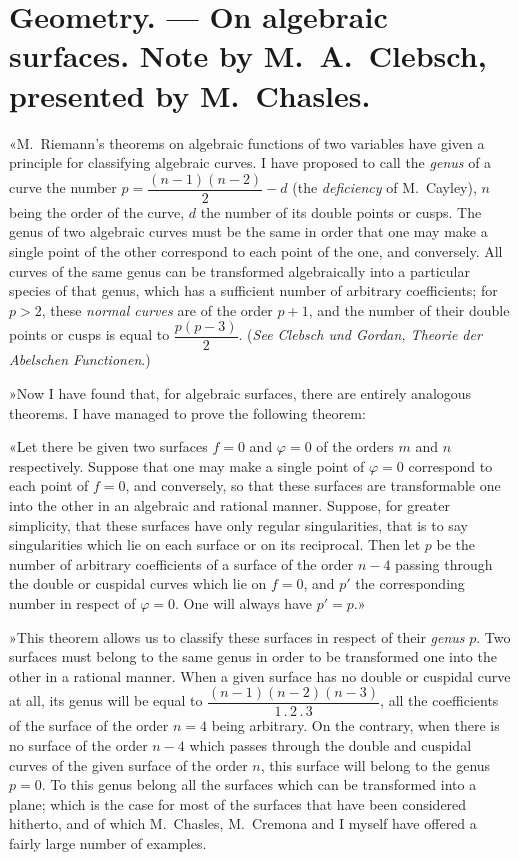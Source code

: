 \documentclass{article}
\begin{document}
\section*{Geometry. --- On algebraic surfaces. Note by M.\ A.\ Clebsch, presented by M.\ Chasles.}

«M.\ Riemann's theorems on algebraic functions of two variables have given a principle for classifying algebraic curves. I have proposed to call the \emph{genus} of a curve the number $p = \dfrac{(n-1)(n-2)}{2} - d$ (the \emph{deficiency} of M.\ Cayley), $n$ being the order of the curve, $d$ the number of its double points or cusps. The genus of two algebraic curves must be the same in order that one may make a single point of the other correspond to each point of the one, and conversely. All curves of the same genus can be transformed algebraically into a particular species of that genus, which has a sufficient number of arbitrary coefficients; for $p > 2$, these \emph{normal curves} are of the order $p + 1$, and the number of their double points or cusps is equal to $\dfrac{p(p-3)}{2}$. (\emph{See Clebsch und Gordan, Theorie der Abelschen Functionen}.)

»Now I have found that, for algebraic surfaces, there are
entirely analogous theorems. I have managed to prove the following theorem:

«Let there be given two surfaces $f = 0$ and $\varphi = 0$ of the orders $m$ and $n$ respectively. Suppose that one may make a single point of $\varphi = 0$ correspond to each point of $f = 0$, and conversely, so that these surfaces are transformable one into the other in an algebraic and rational manner. Suppose, for greater simplicity, that these surfaces have only regular singularities, that is to say singularities which lie on each surface or on its reciprocal. Then let $p$ be the number of arbitrary coefficients of a surface of the order $n - 4$ passing through the double or cuspidal curves which lie on $f = 0$, and $p'$ the corresponding number in respect of $\varphi = 0$. One will always have $p' = p$.»

»This theorem allows us to classify these surfaces in respect of their \emph{genus} $p$. Two surfaces must belong to the same genus in order to be transformed one into the other in a rational manner. When a given surface has no double or cuspidal curve at all, its genus will be equal to $\dfrac{(n-1)(n-2)(n-3)}{1 \,.\, 2 \,.\, 3}$, all the coefficients of the surface of the order $n = 4$ being arbitrary. On the contrary, when there is no surface of the order $n - 4$ which passes through the double and cuspidal curves of the given surface of the order $n$, this surface will belong to the genus $p = 0$. To this genus belong all the surfaces which can be transformed into a plane; which is the case for most of the surfaces that have been considered hitherto, and of which M.\ Chasles, M.\ Cremona and I myself have offered a fairly large number of examples.
\end{document}
